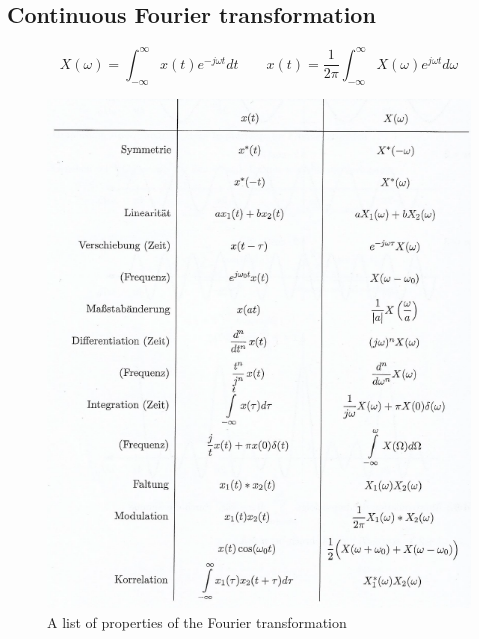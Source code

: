 \documentclass[10pt,a4paper]{article}
\begin{document}
\subsection{Continuous Fourier transformation}
$$
X(\omega) = \int_{-\infty}^{\infty} x(t) e^{-j \omega t} dt \qquad
x(t) = \frac{1}{2\pi} \int_{-\infty}^{\infty} X(\omega) e^{j \omega t} d\omega
$$
\begin{figure}[H]
\centering
\includegraphics[scale=1]{FourierContProperties.PNG}
\caption{A list of properties of the Fourier transformation}
\label{FourierContProperties}
\end{figure}
\end{document}
